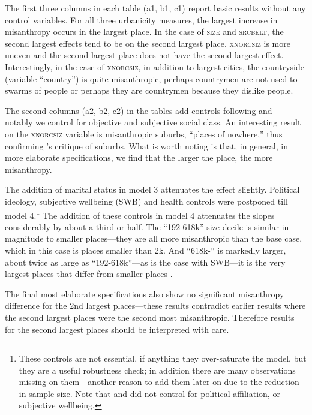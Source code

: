 \documentclass[11pt, letterpaper]{article}
\begin{document}
\begin{spacing}{1.4}
The first three columns in each table (a1, b1, c1) report basic results without any control variables. For all three
urbanicity measures, the largest increase in misanthropy occurs in the largest
place. In the case of \textsc{size} and \textsc{srcbelt}, the second largest effects
tend to be on the second largest place. \textsc{xnorcsiz} is more uneven and the
second largest place does not have the second largest effect. Interestingly, in
the case of \textsc{xnorcsiz}, in addition to largest cities,  the countryside (variable ``country'') is quite
misanthropic, perhaps countrymen are not used to swarms of people or perhaps they are countrymen because they dislike people. 

The second columns (a2, b2, c2) in the tables add controls following \citet{welch07} and \citet{smith97}---notably we control for objective and subjective social class. An interesting result on the \textsc{xnorcsiz} variable is misanthropic suburbs, ``places of nowhere,'' thus confirming \citet{kunstler12}'s critique of suburbs.
What is worth noting is that, in general, in more elaborate specifications, we find that the larger the place, the more misanthropy. 

The addition of marital status in model 3 attenuates the effect slightly. Political ideology, subjective wellbeing (SWB) and health controls were postponed till model 4.\footnote{These controls are not essential, if anything they over-saturate the model, but they are a useful robustness check; in addition there are many observations missing on them---another reason to add them later on due to the reduction in sample size. Note that \citet{smith97} and \citet{wilson85} did not control for political affiliation, or subjective wellbeing.} 
The addition of these controls in model 4 attenuates the slopes considerably by about a third or half. The ``192-618k'' size decile is similar in magnitude to smaller places---they are all  more misanthropic than the base case, which in this case is places smaller than 2k. And ``618k-'' is markedly larger, about twice as large as ``192-618k''---as is the case with SWB---it is the very largest places that differ from smaller places \citep{aokCityBook15}. 

The final most elaborate specifications also show no significant misanthropy
difference for the 2nd largest places---these results contradict earlier results
where the second largest places were the second most misanthropic. Therefore
results for the second largest places should be interpreted with care.


\end{spacing}
\end{document}
